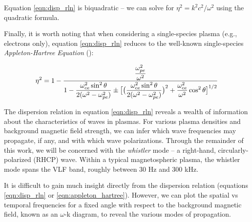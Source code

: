 Equation \eqref{eqn:disp_rln} is biquadratic -- we can solve for $\eta^2 = k^2c^2/\omega^2$ using the quadratic formula.

Finally, it is worth noting that when considering a single-species plasma (e.g., electrons only), equation \eqref{eqn:disp_rln} reduces to the well-known single-species \emph{Appleton-Hartree Equation} (\cite{Appleton1932}):


\begin{equation}
\eta^2 = 1 - \frac{\displaystyle \frac{\omega_{pe}^2}{\omega^2}}{\displaystyle 1 - \frac{\omega_{ce}^2\sin^2\theta}{2(\omega^2 - \omega_{pe}^2)} \pm\big[\big(\frac{\omega_{ce}^2\sin^2\theta}{2(\omega^2 - \omega_{pe}^2)}\big)^2 + \frac{\omega_{ce}^2}{\omega^2}\cos^2\theta\big]^{1/2}}
\label{eqn:appleton_hartree}
\end{equation}


The dispersion relation in equation \eqref{eqn:disp_rln} reveals a wealth of information about the characteristics of waves in plasmas. For various plasma densities and background magnetic field strength, we can infer which wave frequencies may propagate, if any, and with which wave polarizations. Through the remainder of this work, we will be concerned with the \emph{whistler} mode -- a right-hand, circularly-polarized (RHCP) wave. Within a typical magnetospheric plasma, the whistler mode spans the VLF band, roughly between 30 Hz and 300 kHz.

It is difficult to gain much insight directly from the dispersion relation (equations \eqref{eqn:disp_rln} or \eqref{eqn:appleton_hartree}). However, we can plot the spatial vs temporal frequencies for a fixed angle with respect to the background magnetic field, known as an $\omega$-k diagram, to reveal the various modes of propagation.

